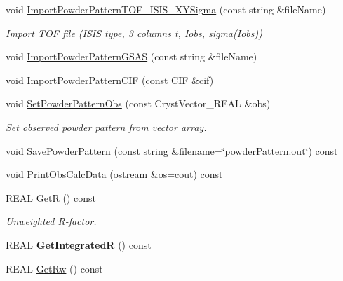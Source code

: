 \begin{DoxyCompactItemize}
void \mbox{\hyperlink{class_obj_cryst_1_1_powder_pattern_a9d7209065acb5a992129cf6a2b14b526}{Import\+Powder\+Pattern\+T\+O\+F\+\_\+\+I\+S\+I\+S\+\_\+\+X\+Y\+Sigma}} (const string \&file\+Name)
\begin{DoxyCompactList}\small\item\em Import T\+OF file (I\+S\+IS type, 3 columns t, Iobs, sigma(\+Iobs)) \end{DoxyCompactList}\item 
void \mbox{\hyperlink{class_obj_cryst_1_1_powder_pattern_a78be27d8764377f99e324a7181eac633}{Import\+Powder\+Pattern\+G\+S\+AS}} (const string \&file\+Name)
\item 
void \mbox{\hyperlink{class_obj_cryst_1_1_powder_pattern_a50348c3084e39c0c8f46a3ddccc03e1f}{Import\+Powder\+Pattern\+C\+IF}} (const \mbox{\hyperlink{class_obj_cryst_1_1_c_i_f}{C\+IF}} \&cif)
\item 
void \mbox{\hyperlink{class_obj_cryst_1_1_powder_pattern_a8562e190d277379e6e18d43f3d616976}{Set\+Powder\+Pattern\+Obs}} (const Cryst\+Vector\+\_\+\+R\+E\+AL \&obs)
\begin{DoxyCompactList}\small\item\em Set observed powder pattern from vector array. \end{DoxyCompactList}\item 
void \mbox{\hyperlink{class_obj_cryst_1_1_powder_pattern_ae9646ceed205b350e0dfa8f1bc5c3e17}{Save\+Powder\+Pattern}} (const string \&filename=\char`\"{}powder\+Pattern.\+out\char`\"{}) const
\item 
void \mbox{\hyperlink{class_obj_cryst_1_1_powder_pattern_ac08650463b3ecba84111c105726f2420}{Print\+Obs\+Calc\+Data}} (ostream \&os=cout) const
\item 
R\+E\+AL \mbox{\hyperlink{class_obj_cryst_1_1_powder_pattern_a2ab62a5d2d1de517a01252875dc905ab}{GetR}} () const
\begin{DoxyCompactList}\small\item\em Unweighted R-\/factor. \end{DoxyCompactList}\item 
\mbox{\label{class_obj_cryst_1_1_powder_pattern_ad709308efe102ea9c71a73c48cef72af}} 
R\+E\+AL {\bfseries Get\+IntegratedR} () const
\item 
R\+E\+AL \mbox{\hyperlink{class_obj_cryst_1_1_powder_pattern_a6fce06a67de15dcba330517d461152f5}{Get\+Rw}} () const
\item 
\mbox{\label{class_obj_cryst_1_1_powder_pattern_aa40fe82546589b4a23c25756a0ee0b7e}} 

\end{DoxyCompactItemize}
